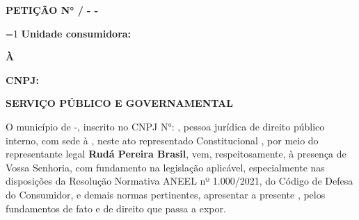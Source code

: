 \providecommand{\ExibirUnidadeConsumidora}{1}

\textbf{PETIÇÃO N° \NumeroDoc{}/\Ano{} - \Municipio{} - \EstadoSigla{}}

\ifnum\ExibirUnidadeConsumidora=1
\textbf{Unidade consumidora: \IPEstimada{}}
\fi

\textbf{À \Concessionaria{}}

\textbf{CNPJ: \CNPJCON{}}

\textbf{SERVIÇO PÚBLICO E GOVERNAMENTAL}

\vspace{0,25cm}

O  município de \textbf{\Municipio{}}-\textbf{\EstadoSigla{}}, inscrito no CNPJ N°: \textbf{\CNPJ{}}, pessoa jurídica de direito público interno, com sede à \textbf{\Sede{}}, neste ato representado \GeneroCargo{} Constitucional \textbf{\PrefeitoNome{}}, por meio do representante legal \textbf{Rudá Pereira Brasil}, vem, respeitosamente, à presença de Vossa Senhoria, com fundamento na legislação aplicável, especialmente nas disposições da Resolução Normativa ANEEL nº 1.000/2021, do Código de Defesa do Consumidor, e demais normas pertinentes, apresentar a presente \textbf{\Peticao{}}, pelos fundamentos de fato e de direito que passa a expor.